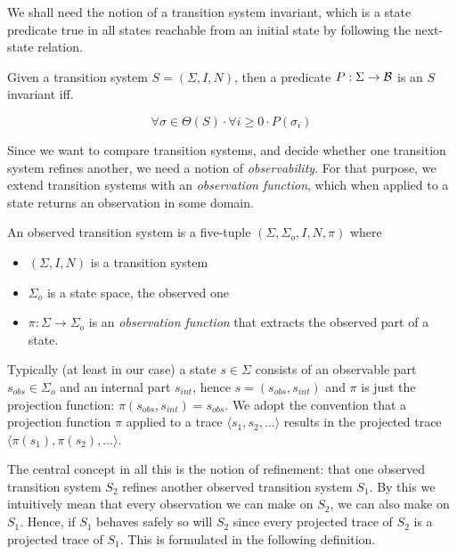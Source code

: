 \noindent
We shall need the notion of a  transition system invariant, which is
a state predicate true  in all states reachable  from an initial state
by following the next-state relation.

\begin{definition}[Invariant]
\label{def-invariants}
Given a transition system $S = (\Sigma,I,N)$, then a predicate 
$P : \Sigma \rightarrow {\cal B}$ is an $S$ invariant iff.

\[
\forall \sigma \in \Theta(S) \cdot 
\forall i \ge 0 \cdot P(\sigma_i)
\]

\end{definition}

\noindent
Since we want to compare transition systems, and decide whether one transition
system refines another, we need a notion of {\em observability}.
For that purpose, we extend transition systems with an {\em observation 
function}, which when applied to a state returns an observation in some domain.

\begin{definition}
\label{def-observed-transition-system}  
An        observed  transition      system      is  a     five-tuple
$(\Sigma,\Sigma_o,I,N,\pi)$ where

\begin{itemize}

  \item $(\Sigma,I,N)$ is a transition system

  \item $\Sigma_o$ is a state space, the observed one

  \item $\pi : \Sigma \rightarrow \Sigma_o$ is an {\em observation function}
        that extracts the observed part of a state.

\end{itemize}
\end{definition}

\noindent
Typically (at least in our case) a state  $s \in \Sigma$ consists
of an   observable  part $s_{obs} \in \Sigma_o$  and  an  internal part
$s_{int}$, hence $s = (s_{obs},s_{int})$ and $\pi$ is just the
projection function: $\pi(s_{obs},s_{int}) = s_{obs}$.
We adopt the convention that a projection  function $\pi$ applied to a
trace $\langle s_1,  s_2, \ldots \rangle$ results in  the
projected trace $\langle \pi(s_1), \pi(s_2), \ldots \rangle$.

The central concept in all this is  the notion of refinement: that one
observed transition system  $S_2$ refines  another observed transition
system $S_1$.  By  this we intuitively mean  that every observation we
can make on  $S_2$,  we can  also make on   $S_1$.  Hence,  if  $S_1$
behaves safely so will $S_2$ since every projected  trace of $S_2$ is  a
projected trace  of $S_1$.  
This is formulated in the following definition.

